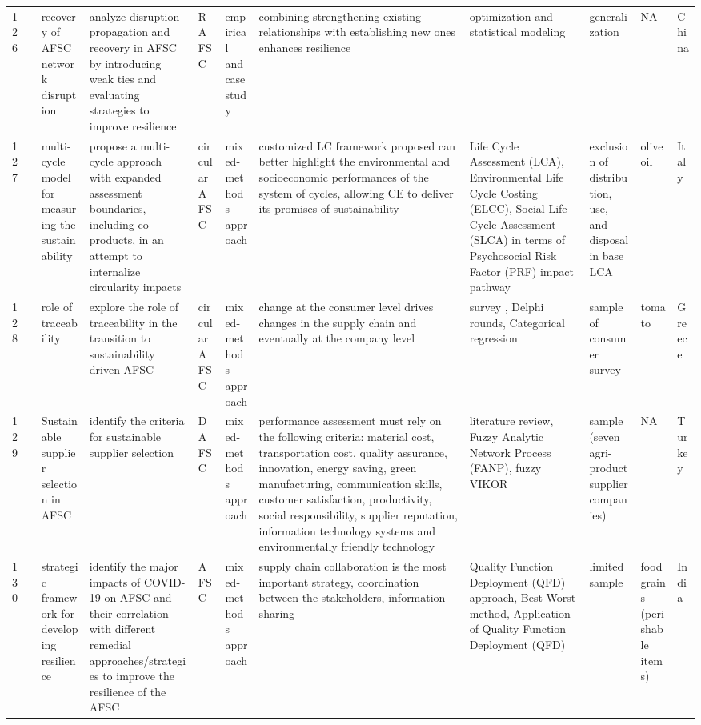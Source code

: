 \documentclass[a4paper,10pt]{article}
\begin{document}
\begin{landscape}
\begin{small}
\begin{longtable}{p{0.5cm} p{2cm} p{2.5cm} p{4cm} p{1cm} p{2.5cm} p{5.5cm} p{2.5cm} p{2.5cm} p{1.8cm} p{1.5cm}}
126 & \textcite{Zhuyue125} &recovery of AFSC network disruption  &analyze disruption propagation and recovery in AFSC by introducing weak ties and evaluating strategies to improve resilience&RAFSC & empirical and case study& combining strengthening existing relationships with establishing new ones enhances resilience &optimization and statistical modeling & generalization& NA& China  \\
127 & \textcite{Stillitano127} & multi-cycle model for measuring the sustainability & propose a multi-cycle approach with expanded assessment boundaries, including co-products, in an attempt to internalize circularity impacts&circular AFSC & mixed-methods approach & customized LC framework proposed can better highlight the environmental and socioeconomic performances of the system of cycles, allowing CE to deliver its promises of sustainability &Life Cycle Assessment (LCA), Environmental Life Cycle Costing (ELCC), Social Life Cycle Assessment (SLCA) in terms of Psychosocial Risk Factor (PRF) impact pathway   & exclusion of distribution, use, and disposal in base LCA& olive oil& Italy  \\
128 & \textcite{Anastasiadis134} &role of traceability & explore the role of traceability in the transition to sustainability driven AFSC&circular AFSC & mixed-methods approach & change at the consumer level drives changes in the supply chain and eventually at the company level &survey , Delphi rounds, Categorical regression   & sample of consumer survey& tomato& Greece  \\
129 & \textcite{Ada144} &Sustainable supplier selection in AFSC & identify the criteria for sustainable supplier selection &DAFSC & mixed-methods approach & performance assessment must rely on the following criteria: material cost, transportation cost, quality assurance, innovation, energy saving, green manufacturing, communication skills, customer satisfaction, productivity, social responsibility, supplier reputation, information technology systems and environmentally friendly technology &literature review, Fuzzy Analytic Network Process (FANP), fuzzy VIKOR   & sample (seven agri-product supplier companies) & NA& Turkey   \\
130 & \textcite{Kumar146} &strategic framework for developing resilience &identify the major impacts of COVID-19 on AFSC and their correlation with different remedial approaches/strategies to improve the resilience of the AFSC&AFSC & mixed-methods approach & supply chain collaboration is the most important strategy, coordination between the stakeholders, information sharing &Quality Function Deployment (QFD) approach, Best-Worst method, Application of Quality Function Deployment (QFD)  &  limited sample& food grains (perishable items)& India  \\

\end{longtable}
\end{small}
\end{landscape}
\end{document}
